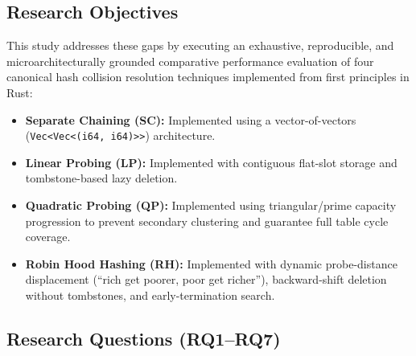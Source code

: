 \documentclass[conference]{IEEEtran}
\begin{document}
\subsection{Research Objectives}

This study addresses these gaps by executing an exhaustive, reproducible, and microarchitecturally grounded comparative performance evaluation of four canonical hash collision resolution techniques implemented from first principles in Rust:
\begin{itemize}
  \item \textbf{Separate Chaining (SC):} Implemented using a vector-of-vectors (\texttt{Vec<Vec<(i64, i64)>>}) architecture.
  \item \textbf{Linear Probing (LP):} Implemented with contiguous flat-slot storage and tombstone-based lazy deletion.
  \item \textbf{Quadratic Probing (QP):} Implemented using triangular/prime capacity progression to prevent secondary clustering and guarantee full table cycle coverage.
  \item \textbf{Robin Hood Hashing (RH):} Implemented with dynamic probe-distance displacement (``rich get poorer, poor get richer''), backward-shift deletion without tombstones, and early-termination search.
\end{itemize}

\subsection{Research Questions (RQ1--RQ7)}
\end{document}
